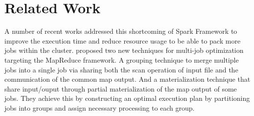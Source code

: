 \documentclass[11.5pt]{article}
\begin{document}
\section{Related Work}
A number of recent works addressed this shortcoming of Spark Framework to improve the execution time and reduce resource usage to be able to pack more jobs within the cluster. \cite{Wang:2013du} proposed two new techniques for multi-job optimization targeting the MapReduce framework. A grouping technique to merge multiple jobs into a single job via sharing both the scan operation of input file and the communication of the common map output. And a materialization technique that share input/ouput through partial materialization of the map output of some jobs. They achieve this by constructing an optimal execution plan by partitioning jobs into groups and assign necessary processing to each group. 




\end{document}

